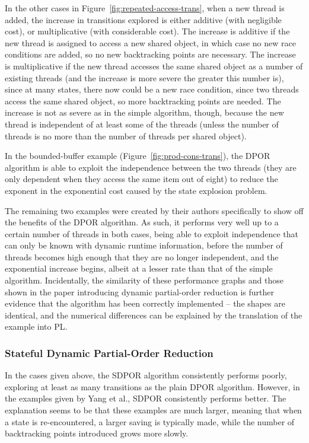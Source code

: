 \documentclass[12pt,a4paper,twoside,openright]{report}
\begin{document}
In the other cases in
Figure~\ref{fig:repeated-access-trans},
when a new thread is added, the increase
in transitions explored
is either additive (with negligible cost),
or multiplicative (with considerable cost).
The increase is additive if the new thread
is assigned to access a new shared object,
in which case no new race conditions are
added, so no new backtracking points are
necessary. The increase is multiplicative
if the new thread accesses the same shared
object as a number of existing threads
(and the increase is more severe the greater
this number is), since at many states, there
now could be a new race condition, since
two threads access the same shared object,
so more backtracking points are needed.
The increase is not as severe as in the
simple algorithm, though, because the new
thread is independent of at least some of
the threads (unless the number of threads
is no more than the number of threads
per shared object).

In the bounded-buffer example
(Figure~\ref{fig:prod-cons-trans}),
the DPOR algorithm is able to exploit
the independence between the two threads
(they are only dependent when they
access the same item out of eight) to
reduce the exponent in the
exponential cost caused by the
state explosion problem.

The remaining two examples were created
by their authors specifically to show
off the benefits of the DPOR algorithm.
As such, it performs very well up to
a certain number of threads in both cases,
being able to exploit independence that can
only be known with dynamic runtime information,
before the number of threads becomes high enough
that they are no longer independent, and the
exponential increase begins, albeit at a lesser
rate than that of the simple algorithm.
Incidentally, the similarity of these performance
graphs and those shown in the paper introducing
dynamic partial-order reduction \cite{flan05}
is further evidence that the algorithm has
been correctly implemented -- the shapes
are identical, and the numerical
differences can be explained by the
translation of the example into PL.

\subsubsection{Stateful Dynamic Partial-Order Reduction}
In the cases given above, the SDPOR algorithm
consistently performs poorly, exploring at
least as many transitions as the plain
DPOR algorithm. However, in the examples
given by Yang et al.\@ \cite{yang08},
SDPOR consistently performs better.
The explanation seems to be that
these examples are much larger, meaning
that when a state is re-encountered,
a larger saving is typically made,
while the number of backtracking
points introduced grows more slowly.
\end{document}
